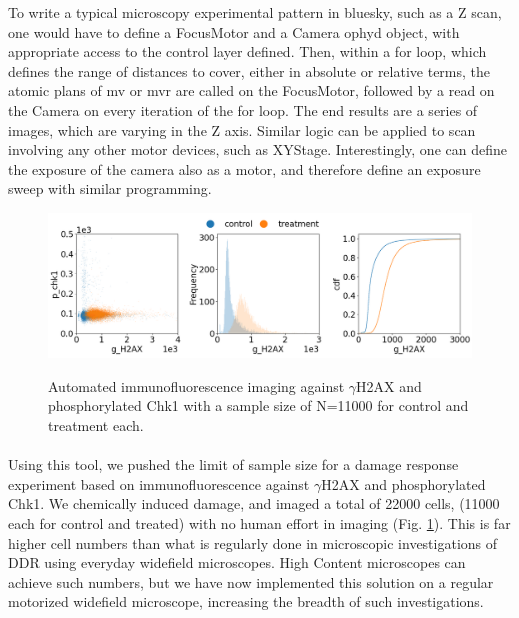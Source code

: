 To write a typical microscopy experimental pattern in bluesky, such as a Z scan, one would have to define a FocusMotor and a Camera ophyd object, with appropriate access to the control layer defined. Then, within a for loop, which defines the range of distances to cover, either in absolute or relative terms, the atomic plans of mv or mvr are called on the FocusMotor, followed by a read on the Camera on every iteration of the for loop. The end results are a series of images, which are varying in the Z axis. Similar logic can be applied to scan involving any other motor devices, such as XYStage. Interestingly, one can define the exposure of the camera also as a motor, and therefore define an exposure sweep with similar programming.


\begin{figure}[H]
    {\hfill\includegraphics[clip, width=1\linewidth]{figures/ncs.png}\hspace*{\fill}}
    \caption{Automated immunofluorescence imaging against $\gamma$H2AX and phosphorylated Chk1 with a sample size of N=11000 for control and treatment each.}
    {\label{fig:ncs}}
\end{figure}

\paragraph*{} Using this tool, we pushed the limit of sample size for a damage response experiment based on immunofluorescence against $\gamma$H2AX and phosphorylated Chk1. We chemically induced damage, and imaged a total of 22000 cells, (11000 each for control and treated) with no human effort in imaging (Fig. \ref{fig:ncs}). This is far higher cell numbers than what is regularly done in microscopic investigations of DDR using everyday widefield microscopes. High Content microscopes can achieve such numbers, but we have now implemented this solution on a regular motorized widefield microscope, increasing the breadth of such investigations.

